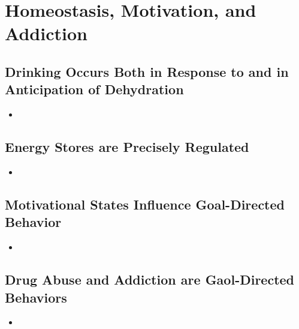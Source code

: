 \documentclass[12pt,a4paper]{article}
\begin{document}
\section{Homeostasis, Motivation, and Addiction}
\subsection{Drinking Occurs Both in Response to and in Anticipation of Dehydration}
\begin{itemize}
    \item 
\end{itemize}

\subsection{Energy Stores are Precisely Regulated}
\begin{itemize}
    \item 
\end{itemize}

\subsection{Motivational States Influence Goal-Directed Behavior}
\begin{itemize}
    \item 
\end{itemize}

\subsection{Drug Abuse and Addiction are Gaol-Directed Behaviors}
\begin{itemize}
    \item 
\end{itemize}


\end{document}
